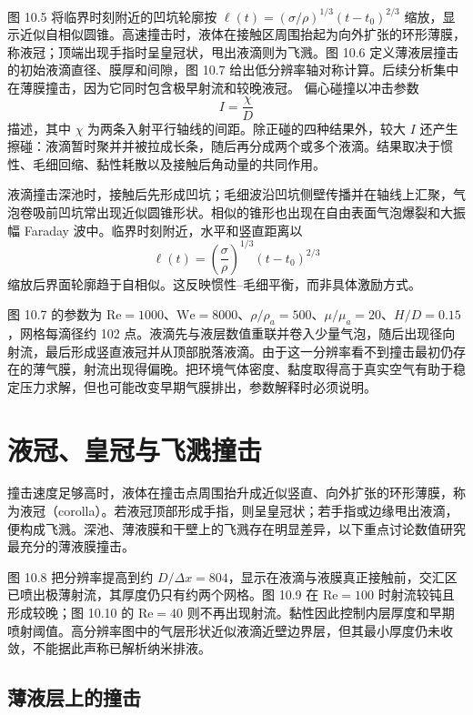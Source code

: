 \documentclass[11pt,a4paper,openany,fontset=none]{ctexbook}
\begin{document}
图 10.5 将临界时刻附近的凹坑轮廓按 $\ell(t)=(\sigma/\rho)^{1/3}(t-t_0)^{2/3}$ 缩放，显示近似自相似圆锥。高速撞击时，液体在接触区周围抬起为向外扩张的环形薄膜，称液冠；顶端出现手指时呈皇冠状，甩出液滴则为飞溅。图 10.6 定义薄液层撞击的初始液滴直径、膜厚和间隙，图 10.7 给出低分辨率轴对称计算。后续分析集中在薄膜撞击，因为它同时包含极早射流和较晚液冠。
偏心碰撞以冲击参数
\begin{equation}
 I=\frac{\chi}{D}
\end{equation}
描述，其中 $\chi$ 为两条入射平行轴线的间距。除正碰的四种结果外，较大 $I$ 还产生擦碰：液滴暂时聚并并被拉成长条，随后再分成两个或多个液滴。结果取决于惯性、毛细回缩、黏性耗散以及接触后角动量的共同作用。

液滴撞击深池时，接触后先形成凹坑；毛细波沿凹坑侧壁传播并在轴线上汇聚，气泡卷吸前凹坑常出现近似圆锥形状。相似的锥形也出现在自由表面气泡爆裂和大振幅 Faraday 波中。临界时刻附近，水平和竖直距离以
\begin{equation}
 \ell(t)=\left(\frac{\sigma}{\rho}\right)^{1/3}(t-t_0)^{2/3}
\end{equation}
缩放后界面轮廓趋于自相似。这反映惯性--毛细平衡，而非具体激励方式。

图 10.7 的参数为 $\mathrm{Re}=1000$、$\mathrm{We}=8000$、$\rho/\rho_a=500$、$\mu/\mu_a=20$、$H/D=0.15$，网格每滴径约 102 点。液滴先与液层数值重联并卷入少量气泡，随后出现径向射流，最后形成竖直液冠并从顶部脱落液滴。由于这一分辨率看不到撞击最初仍存在的薄气膜，射流出现得偏晚。把环境气体密度、黏度取得高于真实空气有助于稳定压力求解，但也可能改变早期气膜排出，参数解释时必须说明。
\section{液冠、皇冠与飞溅撞击}

撞击速度足够高时，液体在撞击点周围抬升成近似竖直、向外扩张的环形薄膜，称为液冠（corolla）。若液冠顶部形成手指，则呈皇冠状；若手指或边缘甩出液滴，便构成飞溅。深池、薄液膜和干壁上的飞溅存在明显差异，以下重点讨论数值研究最充分的薄液膜撞击。

图 10.8 把分辨率提高到约 $D/\Delta x=804$，显示在液滴与液膜真正接触前，交汇区已喷出极薄射流，其厚度仍只有约两个网格。图 10.9 在 $\mathrm{Re}=100$ 时射流较钝且形成较晚；图 10.10 的 $\mathrm{Re}=40$ 则不再出现射流。黏性因此控制内层厚度和早期喷射阈值。高分辨率图中的气层形状近似液滴近壁边界层，但其最小厚度仍未收敛，不能据此声称已解析纳米排液。
\subsection{薄液层上的撞击}
\end{document}
